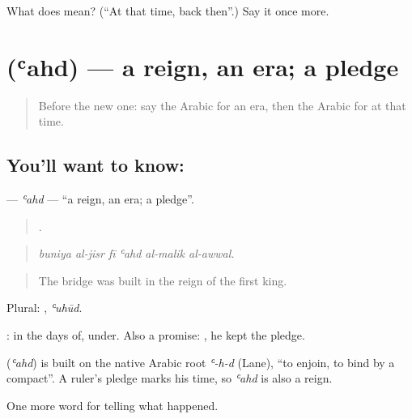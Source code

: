 \begin{tcolorbox}[breakable,colback=teal!4,colframe=teal!35!black,title={Before you move on}]
What does  mean? (\textquotedblleft{}At that time, back then\textquotedblright{}.) Say it once more.
\end{tcolorbox}
\section[\texorpdfstring{\ar{عهد} (ʿahd)}{عهد (ʿahd)}]{ (ʿahd) — a reign, an era; a pledge}

\label{lesson:AR-C304-ahd}



\begin{quote}
Before the new one: say the Arabic for an era, then the Arabic for at that time.
\end{quote}

\subsection*{You'll want to know: }
\textbf{} — \emph{ʿahd} — \textquotedblleft{}a reign, an era; a pledge\textquotedblright{}.

\begin{quote}
     .
\end{quote}

\begin{quote}
\emph{buniya al-jisr fī ʿahd al-malik al-awwal.}
\end{quote}

\begin{quote}
The bridge was built in the reign of the first king.
\end{quote}

Plural: , \emph{ʿuhūd}.

 : in the days of, under. Also a promise:  , he kept the pledge.

\begin{cousinweb}
\textbf{} (\emph{ʿahd}) is built on the native Arabic root \emph{ʿ-h-d} (Lane), \textquotedblleft{}to enjoin, to bind by a compact\textquotedblright{}. A ruler's pledge marks his time, so \emph{ʿahd} is also a reign.
\end{cousinweb}

\begin{grammarlens}[title={What you've built}]
One more word for telling what happened.
\end{grammarlens}

